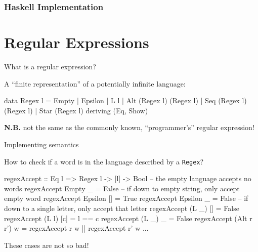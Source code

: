 \documentclass{beamer}
\begin{document}
  \begin{frame}[fragile]
    \frametitle{Haskell Implementation}
  \end{frame}


\section{Regular Expressions}
\begin{frame}[fragile]{What is a regular expression?}

  A ``finite representation'' of a potentially infinite language:

  \begin{code}
data Regex l = Empty | 
               Epsilon |
               L l | 
               Alt (Regex l) (Regex l) |
               Seq (Regex l) (Regex l) |
               Star (Regex l)
  deriving (Eq, Show)
  \end{code} \vspace{1em}
  \textbf{N.B.} not the same as the commonly known, ``programmer's'' regular expression!

\end{frame}

\begin{frame}[fragile]{Implementing semantics}

  How to check if a word is in the language described by a \texttt{Regex}?

  \begin{code}
regexAccept :: Eq l => Regex l -> [l] -> Bool
-- the empty language accepts no words
regexAccept Empty _    = False
-- if down to empty string, only accept empty word
regexAccept Epsilon [] = True  
regexAccept Epsilon _  = False
-- if down to a single letter, only accept that letter 
regexAccept (L _) []   = False
regexAccept (L l) [c]  = l == c
regexAccept (L _) _    = False
regexAccept (Alt r r') w =
                 regexAccept r w || regexAccept r' w
...
\end{code} \vspace{1em}
These cases are not so bad!
\end{frame}
\end{document}
